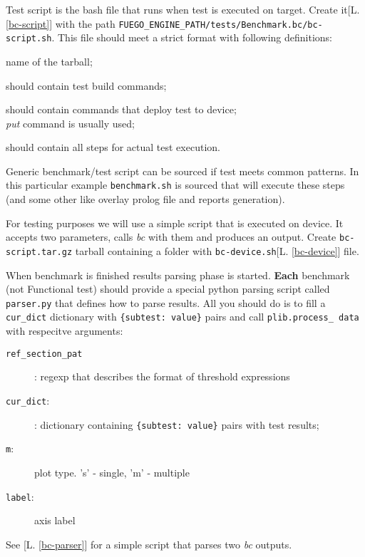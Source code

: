Test script is the bash file that runs when test is executed on target. Create it[L. \ref{bc-script}] with the path \texttt{FUEGO\_ENGINE\_PATH/tests/Benchmark.bc/bc-script.sh}. This file should meet a strict format with following definitions:
\begin{description}
\item[\texttt{tarball}] name of the tarball;
\item[\texttt{test\_build}]  should contain test build commands;
\item[\texttt{test\_deploy}]  should contain  commands that deploy test to device; \\
\textit{put} command is usually used;
\item[\texttt{test\_run}] should contain all steps for actual test execution.
\item Generic benchmark/test script can be sourced if test meets common patterns. In this particular example \texttt{benchmark.sh} is sourced that will execute these steps (and some other like overlay prolog file and reports generation).
\end{description}

For testing purposes we will use a simple script that is executed on device. It accepts two parameters, calls \textit{bc} with them and produces an output. Create \texttt{bc-script.tar.gz} tarball containing a folder with \texttt{bc-device.sh}[L. \ref{bc-device}] file.

When benchmark is finished results parsing phase is started. \textbf{Each}  benchmark (not Functional test) should provide a special python parsing script called \texttt{parser.py} that defines how to parse results. All you should do is to fill a \texttt{cur\_dict} dictionary with \texttt{\{subtest: value\}} pairs and call \texttt{plib.process\_ data} with respecitve arguments:
\begin{description}
\item[\texttt{ref\_section\_pat}]: regexp that describes the format of threshold expressions
\item[\texttt{cur\_dict}:]: dictionary containing \texttt{\{subtest: value\}} pairs with test results;
\item[\texttt{m}:] plot type. 's' - single, 'm' - multiple
\item[\texttt{label}:] axis label
\end{description}

See [L. \ref{bc-parser}] for a simple script that parses two \textit{bc} outputs. 

